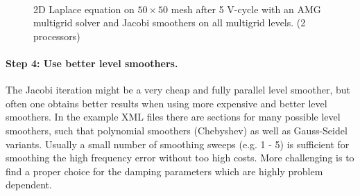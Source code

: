 \documentclass[12pt,a4paper]{article}
\begin{document}
\begin{figure}
\hspace{0.03\textwidth}
\hspace{0.03\textwidth}
 \\
\caption{2D Laplace equation on $50\times 50$ mesh after 5 V-cycle with an AMG multigrid solver and Jacobi smoothers on all multigrid levels. (2 processors)}
\end{figure}

\paragraph{Step 4: Use better level smoothers.}
The Jacobi iteration might be a very cheap and fully parallel level smoother, but often one obtains better results when using more expensive and better level smoothers.
In the example XML files there are sections for many possible level smoothers, such that polynomial smoothers (Chebyshev) as well as Gauss-Seidel variants. Usually a small number of smoothing sweeps (e.g. 1 - 5) is sufficient for smoothing the high frequency error without too high costs. More challenging is to find a proper choice for the damping parameters which are highly problem dependent.
\end{document}
